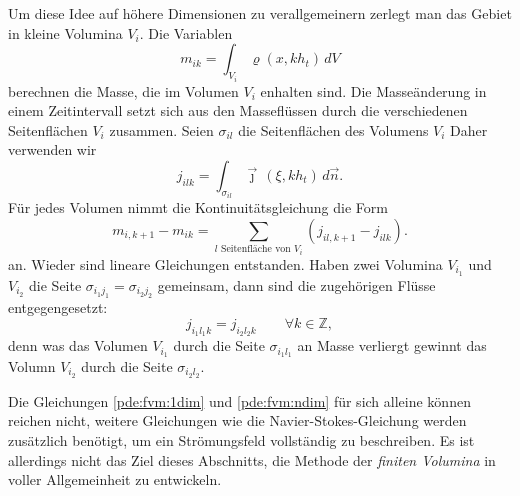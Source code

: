 Um diese Idee auf höhere Dimensionen zu verallgemeinern zerlegt man
das Gebiet in kleine Volumina $V_i$.
Die Variablen
\[
m_{ik} = \int_{V_i} \varrho(x, kh_t)\, dV
\]
berechnen die Masse, die im Volumen $V_i$ enhalten sind.
Die Masseänderung in einem Zeitintervall setzt sich aus den
Masseflüssen durch die verschiedenen Seitenflächen $V_i$ 
zusammen.
Seien $\sigma_{il}$ die Seitenflächen des Volumens $V_i$
Daher verwenden wir 
\[
j_{ilk} = \int_{\sigma_{il}} \vec{\jmath}\,(\xi, kh_t)\,d\vec{n}.
\]
Für jedes Volumen nimmt die Kontinuitätsgleichung die Form
\begin{equation}
m_{i,k+1}-m_{ik}
=
\sum_{\text{$l$ Seitenfläche von $V_i$}} (j_{il,k+1}-j_{ilk}).
\label{pde:fvm:ndim}
\end{equation}
an.
Wieder sind lineare Gleichungen entstanden.
Haben zwei Volumina $V_{i_1}$ und $V_{i_2}$ die Seite
$\sigma_{i_1j_1}=\sigma_{i_2j_2}$ gemeinsam, dann sind die 
zugehörigen Flüsse entgegengesetzt:
\[
j_{i_1l_1k}=j_{i_2l_2k}
\qquad\forall k\in\mathbb Z,
\]
denn was das Volumen $V_{i_1}$ durch die Seite $\sigma_{i_1l_1}$ an
Masse verliergt gewinnt das Volumn $V_{i_2}$ durch die Seite
$\sigma_{i_2l_2}$.

Die Gleichungen \eqref{pde:fvm:1dim} und \eqref{pde:fvm:ndim} für
sich alleine können reichen nicht, weitere Gleichungen wie die
Navier-Stokes-Gleichung werden zusätzlich benötigt, um ein Strömungsfeld
vollständig zu beschreiben.
Es ist allerdings nicht das Ziel dieses Abschnitts, die Methode
der {\em finiten Volumina} in voller Allgemeinheit zu entwickeln.





